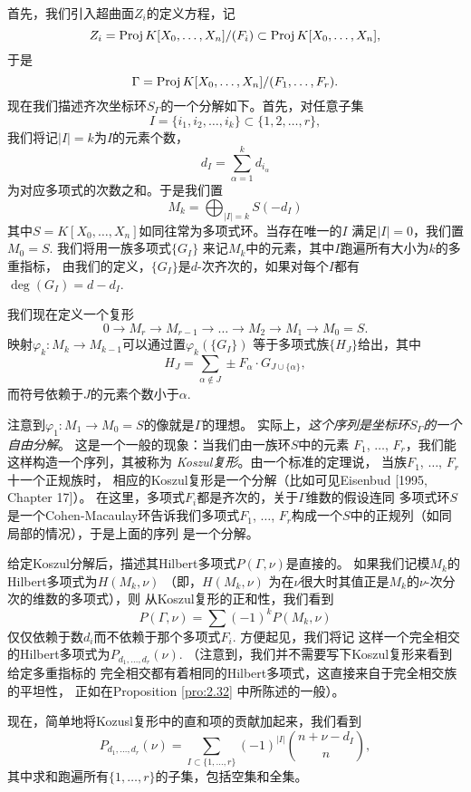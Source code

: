 首先，我们引入超曲面$Z_i$的定义方程，记
\[
	Z_i=\operatorname{Proj} K[X_0,\dots,X_n]/(F_i)\subset 
	\operatorname{Proj} K[X_0,\dots,X_n],
\]
于是
\[
	\Gamma=\operatorname{Proj} K[X_0,\dots,X_n]/(F_1,\dots,F_r).
\]
现在我们描述齐次坐标环$S_\Gamma$的一个分解如下。首先，对任意子集
\[
	I=\{i_1,i_2,\dots,i_k\}\subset \{1,2,\dots,r\},
\]
我们将记$|I|=k$为$I$的元素个数，
\[
	d_I=\sum_{\alpha=1}^k d_{i_\alpha}
\]
为对应多项式的次数之和。于是我们置
\[
	M_k=\bigoplus_{|I|=k}S(-d_I)
\]
其中$S=K[X_0,\dots,X_n]$如同往常为多项式环。当存在唯一的$I$
满足$|I|=0$，我们置$M_0=S$. 我们将用一族多项式$\{G_I\}$
来记$M_k$中的元素，其中$I$跑遍所有大小为$k$的多重指标，
由我们的定义，$\{G_I\}$是$d$-次齐次的，如果对每个$I$都有
$\deg(G_I)=d-d_I$.

我们现在定义一个复形
\[
	0\longrightarrow M_r\longrightarrow M_{r-1}
	 \longrightarrow \dots \longrightarrow M_2
	 \longrightarrow M_1\longrightarrow M_0=S.
\]
映射$\varphi_k:M_k\to M_{k-1}$可以通过置$\varphi_k(\{G_I\})$
等于多项式族$\{H_J\}$给出，其中
\[
	H_J=\sum_{\alpha\not\in J}\pm F_\alpha\cdot 
	G_{J\cup \{\alpha\}},
\]
而符号依赖于$J$的元素个数小于$\alpha$.

注意到$\varphi_1:M_1\to M_0=S$的像就是$\Gamma$的理想。
实际上，\textit{这个序列是坐标环$S_\Gamma$的一个自由分解}。
这是一个一般的现象：当我们由一族环$S$中的元素
$F_1$, $\dots$, $F_r$，我们能这样构造一个序列，其被称为
\textit{Koszul复形}。由一个标准的定理说，
当族$F_1$, $\dots$, $F_r$十一个正规族时，
相应的Koszul复形是一个分解（比如可见Eisenbud [1995, Chapter 17]）。
在这里，多项式$F_i$都是齐次的，关于$\Gamma$维数的假设连同
多项式环$S$是一个Cohen-Macaulay环告诉我们多项式$F_1$, $\dots$,
$F_r$构成一个$S$中的正规列（如同局部的情况），于是上面的序列
是一个分解。


给定Koszul分解后，描述其Hilbert多项式$P(\Gamma,\nu)$是直接的。
如果我们记模$M_k$的Hilbert多项式为$H(M_k,\nu)$ （即，$H(M_k,\nu)$
为在$\nu$很大时其值正是$M_k$的$\nu$-次分次的维数的多项式），则
从Koszul复形的正和性，我们看到
\[
	P(\Gamma,\nu)=\sum (-1)^k P(M_k,\nu)
\]
仅仅依赖于数$d_i$而不依赖于那个多项式$F_i$. 方便起见，我们将记
这样一个完全相交的Hilbert多项式为$P_{d_1,\dots,d_r}(\nu)$.
（注意到，我们并不需要写下Koszul复形来看到给定多重指标的
完全相交都有着相同的Hilbert多项式，这直接来自于完全相交族的平坦性，
正如在Proposition \ref{pro:2.32} 中所陈述的一般）。

现在，简单地将Kozusl复形中的直和项的贡献加起来，我们看到
\[
	P_{d_1,\dots,d_r}(\nu)
	=\sum_{I\subset \{1,\dots,r\}}(-1)^{|I|}
	\binom{n+\nu-d_I}{n},
\]
其中求和跑遍所有$\{1,\dots,r\}$的子集，包括空集和全集。

